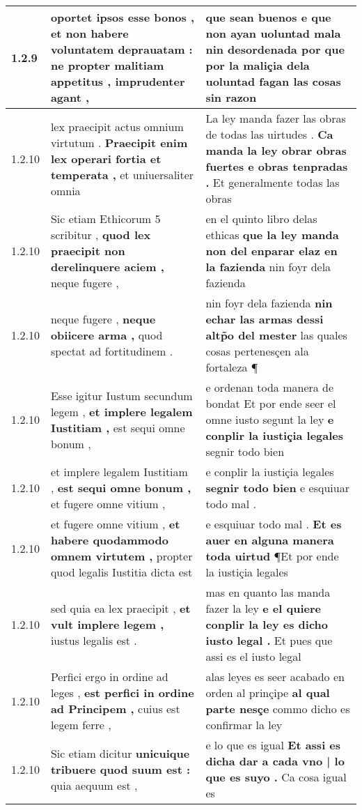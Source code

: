 \begin{tabular}{|p{1cm}|p{6.5cm}|p{6.5cm}|}
1.2.9 & oportet ipsos esse bonos , \textbf{ et non habere voluntatem deprauatam : } ne propter malitiam appetitus , imprudenter agant , & que sean buenos \textbf{ e que non ayan uoluntad mala nin desordenada } por que por la maliçia dela uoluntad fagan las cosas sin razon \\\hline
1.2.10 & lex praecipit actus omnium virtutum . \textbf{ Praecipit enim lex operari fortia et temperata , } et uniuersaliter omnia & La ley manda fazer las obras de todas las uirtudes . \textbf{ Ca manda la ley obrar obras fuertes e obras tenpradas . } Et generalmente todas las obras \\\hline
1.2.10 & Sic etiam Ethicorum 5 scribitur , \textbf{ quod lex praecipit non derelinquere aciem , } neque fugere , & en el quinto libro delas ethicas \textbf{ que la ley manda non del enparar elaz en la fazienda } nin foyr dela fazienda \\\hline
1.2.10 & neque fugere , \textbf{ neque obiicere arma , } quod spectat ad fortitudinem . & nin foyr dela fazienda \textbf{ nin echar las armas dessi altp̃o del mester } las quales cosas pertenesçen ala fortaleza ¶ \\\hline
1.2.10 & Esse igitur Iustum secundum legem , \textbf{ et implere legalem Iustitiam , } est sequi omne bonum , & e ordenan toda manera de bondat Et por ende seer el omne iusto segunt la ley \textbf{ e conplir la iustiçia legales } segnir todo bien \\\hline
1.2.10 & et implere legalem Iustitiam , \textbf{ est sequi omne bonum , } et fugere omne vitium , & e conplir la iustiçia legales \textbf{ segnir todo bien } e esquiuar todo mal . \\\hline
1.2.10 & et fugere omne vitium , \textbf{ et habere quodammodo omnem virtutem , } propter quod legalis Iustitia dicta est & e esquiuar todo mal . \textbf{ Et es auer en alguna manera toda uirtud } ¶Et por ende la iustiçia legales \\\hline
1.2.10 & sed quia ea lex praecipit , \textbf{ et vult implere legem , } iustus legalis est . & mas en quanto las manda fazer la ley \textbf{ e el quiere conplir la ley es dicho iusto legal . } Et pues que assi es el iusto legal \\\hline
1.2.10 & Perfici ergo in ordine ad leges , \textbf{ est perfici in ordine ad Principem , } cuius est legem ferre , & alas leyes es seer acabado en orden al prinçipe \textbf{ al qual parte nesçe } commo dicho es confirmar la ley \\\hline
1.2.10 & Sic etiam dicitur \textbf{ unicuique tribuere quod suum est : } quia aequum est , & e lo que es igual \textbf{ Et assi es dicha dar a cada vno | lo que es suyo . } Ca cosa igual es \\\hline

\end{tabular}
